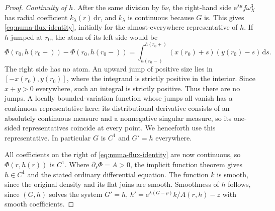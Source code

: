 \begin{proof}
\emph{Continuity of $h$.} After the same division by $6\nu$, the right-hand side $\mathrm{e}^{\lambda u}f\omega_X^3$ has radial coefficient $k_\lambda(r)\,\mathrm{d}r$, and $k_\lambda$ is continuous because $G$ is. This gives \eqref{eq:numa-flux-identity}, initially for the almost-everywhere representative of $h$. If $h$ jumped at $r_0$, the atom of its left side would be
\[
 \Phi(r_0,h(r_0+))-\Phi(r_0,h(r_0-))
 =\int_{h(r_0-)}^{h(r_0+)}(x(r_0)+s)(y(r_0)-s)\,\mathrm{d}s.
\]
The right side has no atom. An upward jump of positive size lies in $[-x(r_0),y(r_0)]$, where the integrand is strictly positive in the interior. Since $x+y>0$ everywhere, such an integral is strictly positive. Thus there are no jumps. A locally bounded-variation function whose jumps all vanish has a continuous representative here: its distributional derivative consists of an absolutely continuous measure and a nonnegative singular measure, so its one-sided representatives coincide at every point. We henceforth use this representative. In particular $G$ is $C^1$ and $G'=h$ everywhere.

All coefficients on the right of \eqref{eq:numa-flux-identity} are now continuous, so $\Phi(r,h(r))$ is $C^1$. Where $\partial_s\Phi=A>0$, the implicit function theorem gives $h\in C^1$ and the stated ordinary differential equation. The function $k$ is smooth, since the original density and its flat joins are smooth. Smoothness of $h$ follows, since $(G,h)$ solves the system $G'=h$, $h'=\mathrm{e}^{\lambda(G-\rho)}k/A(r,h)-z$ with smooth coefficients.
\end{proof}

